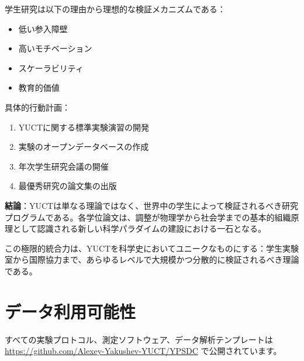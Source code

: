 \documentclass[12pt,a4paper]{article}
\begin{document}
	学生研究は以下の理由から理想的な検証メカニズムである：
	\begin{itemize}
		\item 低い参入障壁
		\item 高いモチベーション
		\item スケーラビリティ
		\item 教育的価値
	\end{itemize}
	
	具体的行動計画：
	\begin{enumerate}
		\item YUCTに関する標準実験演習の開発
		\item 実験のオープンデータベースの作成
		\item 年次学生研究会議の開催
		\item 最優秀研究の論文集の出版
	\end{enumerate}
	
	\textbf{結論}：YUCTは単なる理論ではなく、世界中の学生によって検証されるべき研究プログラムである。各学位論文は、調整が物理学から社会学までの基本的組織原理として認識される新しい科学パラダイムの建設における一石となる。
	
	この極限的統合力は、YUCTを科学史においてユニークなものにする：学生実験室から国際協力まで、あらゆるレベルで大規模かつ分散的に検証されるべき理論である。
	
	\section*{データ利用可能性}
	すべての実験プロトコル、測定ソフトウェア、データ解析テンプレートは \url{https://github.com/Alexey-Yakushev-YUCT/YPSDC} で公開されています。
	
\end{document}
